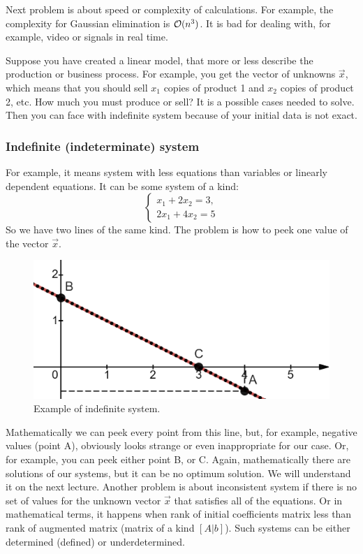     \par
    Next problem is about speed or complexity of calculations. For example, the complexity for Gaussian elimination is ${\cal O}(n^3)$. It is bad for dealing with, for example, video or signals in real time. 
    \par 
    Suppose you have created a linear model, that more or less describe the production or business process. For example, you get the vector of unknowns $\vec{x}$, which means that you should sell $x_1$ copies of product 1 and $x_2$ copies of product 2, etc. How much you must produce or sell? It is a possible cases needed to solve. Then you can face with indefinite system because of your initial data is not exact.
    \subsubsection*{Indefinite (indeterminate) system}
    For example, it means system with less equations than variables or linearly dependent equations. It can be some system of a kind:
    \[
        \left\{ \begin{array}{c}
            x_1 + 2x_2 = 3,\\
            2x_1 + 4x_2 = 5
        \end{array}
            \right.  
    \]
    So we have two lines of the same kind. The problem is how to peek one value of the vector $\vec{x}$. 
    \begin{figure}
        \includegraphics[height=0.235\columnwidth, width=0.5\columnwidth]{lectures/images/indefinite_system.png}
        \caption*{\scriptsize{Example of indefinite system.}}
        \label{fig:indefinite_system}
    \end{figure}
    Mathematically we can peek every point from this line, but, for example, negative values (point A), obviously looks strange or even inappropriate for our case. Or, for example, you can peek either point B, or C. Again, mathematically there are solutions of our systems, but it can be no optimum solution. We will understand it on the next lecture. Another problem is about inconsistent system if there is no set of values for the unknown vector $\vec{x}$ that satisfies all of the equations. Or in mathematical terms, it happens when rank of initial coefficients matrix less than rank of augmented matrix (matrix of a kind $[A|b]$). Such systems can be either determined (defined) or underdetermined.
